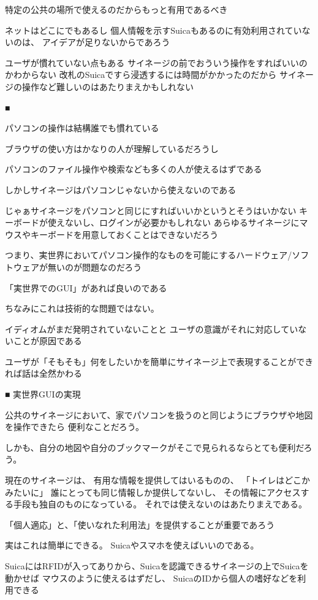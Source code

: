 特定の公共の場所で使えるのだからもっと有用であるべき

ネットはどこにでもあるし
個人情報を示すSuicaもあるのに有効利用されていないのは、
アイデアが足りないからであろう

ユーザが慣れていない点もある
サイネージの前でおういう操作をすればいいのかわからない
改札のSuicaですら浸透するには時間がかかったのだから
サイネージの操作など難しいのはあたりまえかもしれない

■

パソコンの操作は結構誰でも慣れている

ブラウザの使い方はかなりの人が理解しているだろうし

パソコンのファイル操作や検索なども多くの人が使えるはずである

しかしサイネージはパソコンじゃないから使えないのである

じゃぁサイネージをパソコンと同じにすればいいかというとそうはいかない
キーボードが使えないし、ログインが必要かもしれない
あらゆるサイネージにマウスやキーボードを用意しておくことはできないだろう

つまり、実世界においてパソコン操作的なものを可能にするハードウェア/ソフトウェアが無いのが問題なのだろう

「実世界でのGUI」があれば良いのである


ちなみにこれは技術的な問題ではない。

イディオムがまだ発明されていないことと
ユーザの意識がそれに対応していないことが原因である

ユーザが「そもそも」何をしたいかを簡単にサイネージ上で表現することができれば話は全然かわる

■ 実世界GUIの実現

公共のサイネージにおいて、家でパソコンを扱うのと同じようにブラウザや地図を操作できたら
便利なことだろう。

しかも、自分の地図や自分のブックマークがそこで見られるならとても便利だろう。

現在のサイネージは、
有用な情報を提供してはいるものの、
「トイレはどこかみたいに」
誰にとっても同じ情報しか提供してないし、
その情報にアクセスする手段も独自のものになっている。
それでは使えないのはあたりまえである。

「個人適応」と、「使いなれた利用法」を提供することが重要であろう


実はこれは簡単にできる。
Suicaやスマホを使えばいいのである。

SuicaにはRFIDが入ってありから、Suicaを認識できるサイネージの上でSuicaを動かせば
マウスのように使えるはずだし、
SuicaのIDから個人の嗜好などを利用できる


